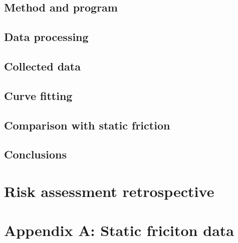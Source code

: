 \documentclass[12pt]{article}
\begin{document}
\subsection{Method and program}


\subsection{Data processing}

\subsection{Collected data}

\subsection{Curve fitting}

\subsection{Comparison with static friction}

\subsection{Conclusions}


\section{Risk assessment retrospective}

\printbibliography

\clearpage

\section*{Appendix A: Static friciton data}
\end{document}
